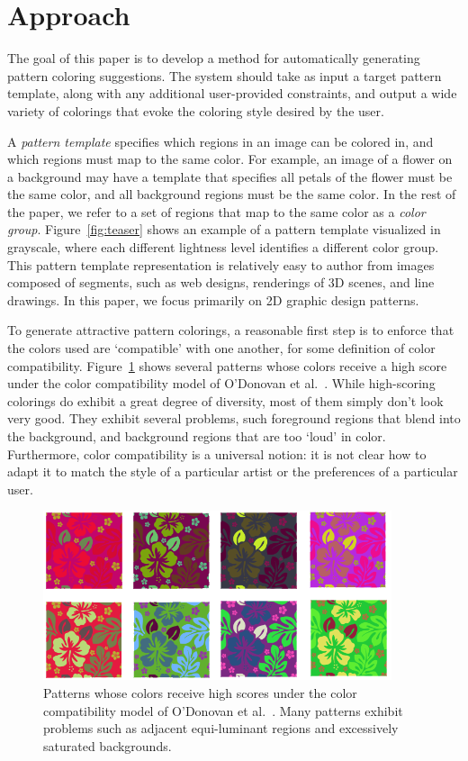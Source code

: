 \section{Approach}
\label{sec:approach}

The goal of this paper is to develop a method for automatically generating pattern coloring suggestions. The system should take as input a target pattern template, along with any additional user-provided constraints, and output a wide variety of colorings that evoke the coloring style desired by the user.

A \emph{pattern template} specifies which regions in an image can be colored in, and which regions must map to the same color. For example, an image of a flower on a background may have a template that specifies all petals of the flower must be the same color, and all background regions must be the same color. In the rest of the paper, we refer to a set of regions that map to the same color as a \emph{color group}. Figure~\ref{fig:teaser} shows an example of a pattern template visualized in grayscale, where each different lightness level identifies a different color group. This pattern template representation is relatively easy to author from images composed of segments, such as web designs, renderings of 3D scenes, and line drawings. In this paper, we focus primarily on 2D graphic design patterns. 

To generate attractive pattern colorings, a reasonable first step is to enforce that the colors used are `compatible' with one another, for some definition of color compatibility. Figure~\ref{fig:ColorCompatOnly} shows several patterns whose colors receive a high score under the color compatibility model of O'Donovan et al.~. While high-scoring colorings do exhibit a great degree of diversity, most of them simply don't look very good. They exhibit several problems, such foreground regions that blend into the background, and background regions that are too `loud' in color. Furthermore, color compatibility is a universal notion: it is not clear how to adapt it to match the style of a particular artist or the preferences of a particular user.

\begin{figure}
\centering
\includegraphics[width=\columnwidth]{figs/colorCompatOnly}
\caption{Patterns whose colors receive high scores under the color compatibility model of O'Donovan et al.~. Many patterns exhibit problems such as adjacent equi-luminant regions and excessively saturated backgrounds.~}
\label{fig:ColorCompatOnly}
\end{figure}

